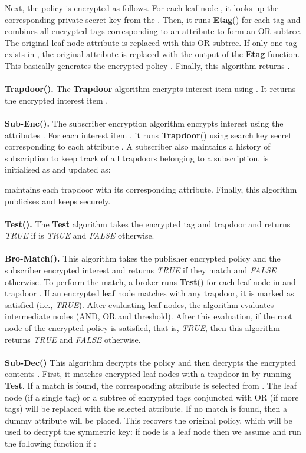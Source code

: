 \documentclass[epsfig,a4paper,11pt,titlepage]{book}
\numberwithin{algorithm}{chapter}
\begin{document}
Next, the policy  is encrypted as follows. For each leaf node , it looks up the corresponding private secret key  from the . Then, it runs \textbf{Etag}() for each tag  and combines all encrypted tags corresponding to an attribute to form an OR subtree. The original leaf node attribute is replaced with this OR subtree. If only one tag exists in , the original attribute is replaced with the output of the \textbf{Etag} function. This basically generates the encrypted policy . Finally, this algorithm returns . \\ \\
\textbf{Trapdoor().} The \textbf{Trapdoor} algorithm encrypts interest item  using . It returns the encrypted interest item . \\ \\
\textbf{Sub-Enc().} The subscriber encryption algorithm encrypts interest  using the attributes . For each interest item , it runs \textbf{Trapdoor}() using search key secret  corresponding to each attribute . A subscriber also maintains a history of subscription  to keep track of all trapdoors belonging to a subscription.  is initialised as  and updated as: 

 maintains each trapdoor with its corresponding attribute. Finally, this algorithm publicises  and keeps  securely. \\ \\
\textbf{Test().} The \textbf{Test} algorithm takes the encrypted tag and trapdoor and returns \emph{TRUE} if  is \emph{TRUE} and \emph{FALSE} otherwise. \\ \\
\textbf{Bro-Match().} This algorithm takes the publisher encrypted policy  and the subscriber encrypted interest  and returns \emph{TRUE} if they match and \emph{FALSE} otherwise. To perform the match, a broker runs \textbf{Test}() for each leaf node  in  and trapdoor . If an encrypted leaf node matches with any trapdoor, it is marked as satisfied (i.e., \emph{TRUE}). After evaluating leaf nodes, the algorithm evaluates intermediate nodes (AND, OR and threshold). After this evaluation, if the root node of the encrypted policy  is satisfied, that is, \emph{TRUE}, then this algorithm returns \emph{TRUE} and \emph{FALSE} otherwise. \\ \\
\textbf{Sub-Dec()} This algorithm decrypts the policy  and then decrypts the encrypted contents . First, it matches encrypted leaf nodes with a trapdoor in  by running \textbf{Test}. If a match is found, the corresponding attribute is selected from . The leaf node (if a single tag) or a subtree of encrypted tags conjuncted with OR (if more tags) will be replaced with the selected attribute. If no match is found, then a dummy attribute will be placed. This recovers the original policy, which will be used to decrypt the symmetric key:
 if node  is a leaf node then we assume  and run the following function if :
\end{document}
